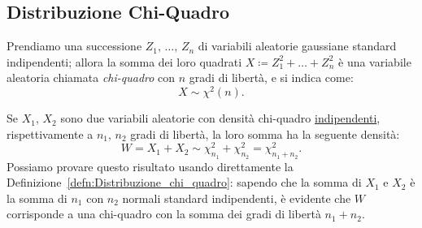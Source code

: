         \subsection{Distribuzione Chi-Quadro}
            \begin{defn}\label{defn:Distribuzione_chi_quadro}
                Prendiamo una successione $Z_1,\, \ldots,\, Z_{n}$ di variabili aleatorie gaussiane standard indipendenti; allora la somma dei loro quadrati $X \coloneqq Z^2_1 + \ldots + Z^2_{n}$ è una variabile aleatoria chiamata \emph{chi-quadro} con $n$ gradi di libertà, e si indica come: \[
                    X \sim \chi^2(n)
                .\]
            \end{defn}
            \begin{obsv}[Riproducibilità]
                Se $X_1,\,X_2$ sono due variabili aleatorie con densità chi-quadro \underline{indipendenti}, rispettivamente a $n_1,\,n_2$ gradi di libertà, la loro somma ha la seguente densità: \[
                    W = X_1 + X_2 \sim \chi^2_{n_1} + \chi^2_{n_2} = \chi^2_{n_1+n_2}
                .\] Possiamo provare questo risultato usando direttamente la Definizione~\ref{defn:Distribuzione_chi_quadro}: sapendo che la somma di $X_1$ e $X_2$ è la somma di $n_1$ con $n_2$ normali standard indipendenti, è evidente che $W$ corrisponde a una chi-quadro con la somma dei gradi di libertà $n_1+n_2$.
            \end{obsv}
